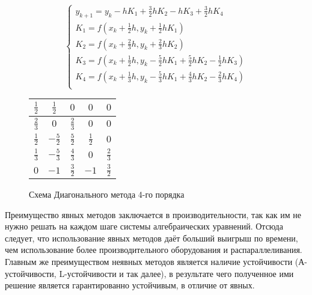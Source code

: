 \begin{figure}
    \begin{minipage}[t]{8.5cm}
        {\small
        \begin{equation*}
            \begin{cases}
                y_{k + 1} = y_k - hK_1 + \frac{3}{2}hK_2 - hK_3 + \frac{3}{2}hK_4\\
                K_1 = f(x_k + \frac{1}{2}h, y_k + \frac{1}{2}hK_1)\\
                K_2 = f(x_k + \frac{2}{3}h, y_k + \frac{2}{3}hK_2)\\
                K_3 = f(x_k + \frac{1}{2}h, y_k - \frac{5}{2}hK_1 + \frac{5}{2}hK_2 - \frac{1}{2}hK_3)\\
                K_4 = f(x_k + \frac{1}{3}h, y_k - \frac{5}{3}hK_1 + \frac{4}{3}hK_2 - \frac{2}{3}hK_4)\\
            \end{cases}
        \end{equation*}
        }
    \end{minipage}
    \begin{minipage}[t]{7.5cm}
        \begin{table}    
            \begin{tabular}{|c|c|c|c|c|}
            \hline
            $\frac{1}{2}$ & $\frac{1}{2}$ & $0$ & $0$ & $0$\\
            \hline
            $\frac{2}{3}$ & $0$ & $\frac{2}{3}$ & $0$ & $0$\\
            \hline
            $\frac{1}{2}$ & $-\frac{5}{2}$ & $\frac{5}{2}$ & $\frac{1}{2}$ & $0$\\
            \hline
            $\frac{1}{3}$ & $-\frac{5}{3}$ & $\frac{4}{3}$ & $0$ & $\frac{2}{3}$\\
            \hline
            $0$ & \cellcolor{lightgray} $-1$ & \cellcolor{lightgray} $\frac{3}{2}$ & \cellcolor{lightgray} $-1$ & \cellcolor{lightgray} $\frac{3}{2}$\\
            \hline
            \end{tabular}
        \end{table}
    \end{minipage}
    \caption{Схема Диагонального метода 4-го порядка}
    \label{fig:Diagonal4}
\end{figure}

Преимущество явных методов заключается в производительности, так как им не нужно решать на каждом шаге системы алгебраических
уравнений. Отсюда следует, что использование явных методов даёт больший выигрыш по времени, чем использование более производительного
оборудования и распараллеливания. Главным же преимуществом неявных методов является наличие устойчивости (А-устойчивости, L-устойчивости и
так далее), в результате чего полученное ими решение является гарантированно устойчивым, в отличие от явных.


